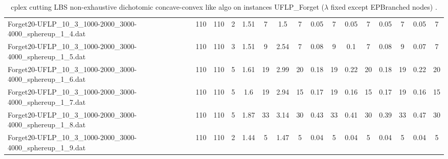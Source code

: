 \begin{sidewaystable}[!ht]
{\begin{tabular}{lccccccccccccccc}
Forget20-UFLP\_10\_3\_1000-2000\_3000-4000\_sphereup\_1\_4.dat & 110 & 110 & 2 & 1.51 & 7 & 1.5 & 7 &  \textcolor{blue2}{0.05} & 7 &  \textcolor{blue2}{0.05} & 7 &  \textcolor{blue2}{0.05} & 7 &  \textcolor{blue2}{0.05} & 7 \\
Forget20-UFLP\_10\_3\_1000-2000\_3000-4000\_sphereup\_1\_5.dat & 110 & 110 & 3 & 1.51 & 9 & 2.54 & 7 & 0.08 & 9 & 0.1 & 7 & 0.08 & 9 &  \textcolor{blue2}{0.07} & 7 \\
Forget20-UFLP\_10\_3\_1000-2000\_3000-4000\_sphereup\_1\_6.dat & 110 & 110 & 5 & 1.61 & 19 & 2.99 & 20 &  \textcolor{blue2}{0.18} & 19 & 0.22 & 20 &  \textcolor{blue2}{0.18} & 19 & 0.22 & 20 \\
Forget20-UFLP\_10\_3\_1000-2000\_3000-4000\_sphereup\_1\_7.dat & 110 & 110 & 5 & 1.6 & 19 & 2.94 & 15 & 0.17 & 19 &  \textcolor{blue2}{0.16} & 15 & 0.17 & 19 &  \textcolor{blue2}{0.16} & 15 \\
Forget20-UFLP\_10\_3\_1000-2000\_3000-4000\_sphereup\_1\_8.dat & 110 & 110 & 5 & 1.87 & 33 & 3.14 & 30 & 0.43 & 33 & 0.41 & 30 &  \textcolor{blue2}{0.39} & 33 & 0.47 & 30 \\
Forget20-UFLP\_10\_3\_1000-2000\_3000-4000\_sphereup\_1\_9.dat & 110 & 110 & 2 & 1.44 & 5 & 1.47 & 5 &  \textcolor{blue2}{0.04} & 5 &  \textcolor{blue2}{0.04} & 5 &  \textcolor{blue2}{0.04} & 5 &  \textcolor{blue2}{0.04} & 5 \\
\bottomrule
\end{tabular}
}%
\caption{cplex cutting LBS non-exhaustive dichotomic concave-convex like algo on instances UFLP_Forget ($\lambda$ fixed except EPBranched nodes) .}
\end{sidewaystable}
